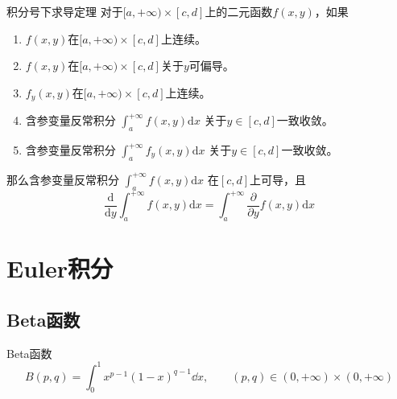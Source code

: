 \documentclass[lang = cn, scheme = chinese, thmcnt = section]{elegantbook}
\newcommand{\dis}{\displaystyle}
\begin{document}
\begin{theorem}{积分号下求导定理}
	对于$[a,+\infty)\times[c,d]$上的二元函数$f(x,y)$，如果
	\begin{enumerate}
		\item $f(x,y)$在$[a,+\infty)\times[c,d]$上连续。
		\item $f(x,y)$在$[a,+\infty)\times[c,d]$关于$y$可偏导。
		\item $f_y(x,y)$在$[a,+\infty)\times[c,d]$上连续。
		\item 含参变量反常积分
		$\dis\int_{a}^{+\infty}{f(x,y)\mathrm{d}x}$
		关于$y\in[c,d]$​一致收敛。
		\item 含参变量反常积分
		$\dis\int_{a}^{+\infty}{f_y(x,y)\mathrm{d}x}$
		关于$y\in[c,d]$一致收敛。
	\end{enumerate}
	那么含参变量反常积分
	$\dis\int_{a}^{+\infty}{f(x,y)\mathrm{d}x}$
	在$[c,d]$上可导，且
	$$
	\frac{\mathrm{d}}{\mathrm{d}y}\int_{a}^{+\infty}{f(x,y)\mathrm{d}x}=\int_{a}^{+\infty}{\frac{\partial}{\partial y}f(x,y)\mathrm{d}x}
	$$
\end{theorem}

\section{Euler积分}

\subsection{Beta函数}

\begin{definition}{Beta函数}
	$$
	B(p,q)=\int_{0}^{1}x^{p-1}(1-x)^{q-1}\dd x,\qquad (p,q)\in (0,+\infty)\times (0,+\infty)
	$$
\end{definition}
\end{document}
